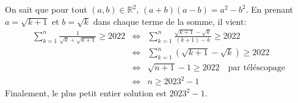 On sait que pour tout $(a,b)\in\mathbb{R}^2$, $(a+b)(a-b)=a^2-b^2$. En prenant $a=\sqrt{k+1}$ et $b=\sqrt{k}$ dans chaque terme de la somme, il vient:
\begin{eqnarray}
  \sum_{k=1}^n{\frac{1}{\sqrt{k}+\sqrt{k+1}}} \geq 2022 &\Leftrightarrow & \sum_{k=1}^n{\frac{\sqrt{k+1}-\sqrt{k}}{(k+1)-k}} \geq 2022 \nonumber \\
  &\Leftrightarrow & \sum_{k=1}^n{\left(\sqrt{k+1}-\sqrt{k}\right)} \geq 2022 \nonumber \\
  &\Leftrightarrow &  \sqrt{n+1} - 1 \geq 2022 \quad \textrm{par téléscopage}\nonumber \\
  &\Leftrightarrow &  n\geq 2023^2-1 \nonumber 
\end{eqnarray}
 Finalement, le plus petit entier solution est $2023^2-1$.
